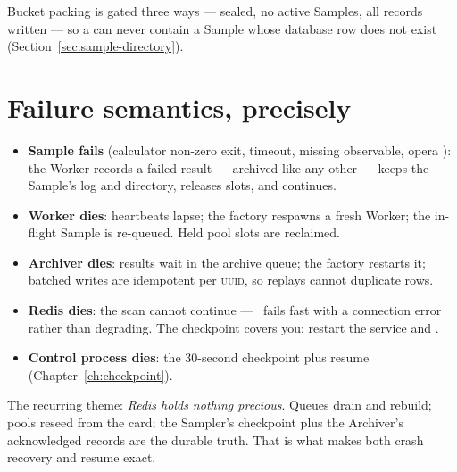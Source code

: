 Bucket packing is gated three ways --- sealed, no active Samples, all records written
--- so a  can never contain a Sample whose database row does not exist
(Section~\ref{sec:sample-directory}).

\section{Failure semantics, precisely}
\label{sec:runtime-failures}

\begin{itemize}
  \item \textbf{Sample fails} (calculator non-zero exit, timeout, missing observable,
        opera ): the Worker records a failed result --- archived like
        any other --- keeps the Sample's log and directory, releases slots, and
        continues.
  \item \textbf{Worker dies}: heartbeats lapse; the factory respawns a fresh Worker;
        the in-flight Sample is re-queued. Held pool slots are reclaimed.
  \item \textbf{Archiver dies}: results wait in the archive queue; the factory
        restarts it; batched writes are idempotent per \textsc{uuid}, so replays cannot
        duplicate rows.
  \item \textbf{Redis dies}: the scan cannot continue --- \Jtwo\ fails fast with a
        connection error rather than degrading. The checkpoint covers you: restart the
        service and .
  \item \textbf{Control process dies}: the 30-second checkpoint plus resume
        (Chapter~\ref{ch:checkpoint}).
\end{itemize}

\begin{jnote}
The recurring theme: \emph{Redis holds nothing precious}. Queues drain and rebuild;
pools reseed from the card; the Sampler's checkpoint plus the Archiver's acknowledged
records are the durable truth. That is what makes both crash recovery and resume exact.
\end{jnote}
